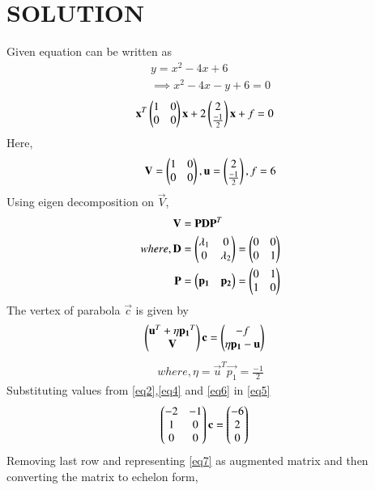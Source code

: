 \documentclass[journal,12pt,twocolumn]{IEEEtran}
\begin{document}
\section{SOLUTION} 
Given equation can be written as
\begin{align}
y = x^2-4x+6      \label{eq1}
\\
\implies x^2-4x-y+6 =0
\end{align}
\begin{align}
\mathbf{x}^T\begin{pmatrix}1 & 0 \\ 0 & 0\end{pmatrix}\mathbf{x}+ 2\begin{pmatrix}2 \\ \frac{-1}{2}\end{pmatrix}\mathbf{x}+f&=0
\end{align}
Here,
\begin{align}
\mathbf{V}=\begin{pmatrix}1 & 0 \\ 0 & 0\end{pmatrix},\mathbf{u}=\begin{pmatrix}2 \\ \frac{-1}{2}\end{pmatrix},f=6  \label{eq2}
\end{align}
Using eigen decomposition on $\vec{V}$,
\begin{align}
\mathbf{V}&=\mathbf{P}\mathbf{D}\mathbf{P}^T
\\
where,\mathbf{D}&=\begin{pmatrix}\lambda_1 & 0 \\ 0 & \lambda_2\end{pmatrix} = \begin{pmatrix}0 & 0\\0 & 1\end{pmatrix}   \label{eq3}
\\
\mathbf{P}&=\begin{pmatrix}\mathbf{p_1} & \mathbf{p_2}\end{pmatrix} =\begin{pmatrix}0 & 1\\1 & 0\end{pmatrix}  \label{eq4}
\end{align}
The vertex of parabola $\vec{c}$ is given by
\begin{align}
\begin{pmatrix}\mathbf{u}^T + \eta\mathbf{p_1}^T \\ \mathbf{V}\end{pmatrix}\mathbf{c} &= \begin{pmatrix}-f \\ \eta\mathbf{p_1}-\mathbf{u}\end{pmatrix} \label{eq5}
\end{align}
\begin{align}
where,\eta=\vec{u}^T\vec{p_1}=\frac{-1}{2}  \label{eq6}
\end{align}
Substituting values from \eqref{eq2},\eqref{eq4} and \eqref{eq6} in \eqref{eq5}
\begin{align}
\begin{pmatrix}-2 & -1 \\ 1 & 0 \\ 0 & 0\end{pmatrix}\mathbf{c} &= \begin{pmatrix}-6 \\ 2 \\ 0\end{pmatrix} \label{eq7}
\end{align}
Removing last row and representing \eqref{eq7} as augmented matrix and then converting the matrix to echelon form,
\end{document}
